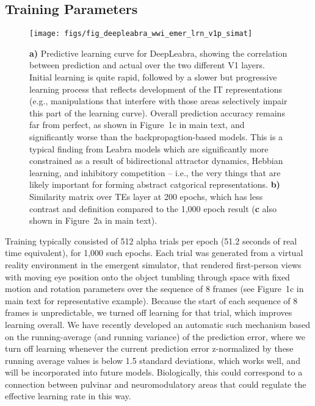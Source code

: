 \documentclass[12pt,twoside]{article}
\newif\myifpdf
\begin{document}
\subsection{Training Parameters}

\begin{figure}
  \centering\texttt{[image: figs/fig\_deepleabra\_wwi\_emer\_lrn\_v1p\_simat]}
  \caption{{\bf a)} Predictive learning curve for DeepLeabra, showing the correlation between prediction and actual over the two different V1 layers.  Initial learning is quite rapid, followed by a slower but progressive learning process that reflects development of the IT representations (e.g., manipulations that interfere with those areas selectively impair this part of the learning curve).  Overall prediction accuracy remains far from perfect, as shown in Figure~1c in main text, and significantly worse than the backpropagtion-based models.  This is a typical finding from Leabra models which are significantly more constrained as a result of bidirectional attractor dynamics, Hebbian learning, and inhibitory competition -- i.e., the very things that are likely important for forming abstract catgorical representations. {\bf b)} Similarity matrix over TEs layer at 200 epochs, which has less contrast and definition compared to the 1,000 epoch result ({\bf c} also shown in Figure~2a in main text).}
  \label{fig.lrn}
\end{figure}

Training typically consisted of 512 alpha trials per epoch (51.2 seconds of real time equivalent), for 1,000 such epochs. Each trial was generated from a virtual reality environment in the emergent simulator, that rendered first-person views with moving eye position onto the object tumbling through space with fixed motion and rotation parameters over the sequence of 8 frames (see Figure~1c in main text for representative example).  Because the start of each sequence of 8 frames is unpredictable, we turned off learning for that trial, which improves learning overall.  We have recently developed an automatic such mechanism based on the running-average (and running variance) of the prediction error, where we turn off learning whenever the current prediction error z-normalized by these running average values is below 1.5 standard deviations, which works well, and will be incorporated into future models.  Biologically, this could correspond to a connection between pulvinar and neuromodulatory areas that could regulate the effective learning rate in this way.
\end{document}
